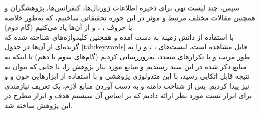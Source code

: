 سپس، چند لیست تهی برای ذخیره اطلاعات ژورنال‌ها، کنفرانس‌ها، پژوهشگران و همچنین مقالات مختلف مرتبط و موثر در این حوزه تحقیقاتی ساختیم، که به‌طور خلاصه با حروف
، ،  و 
از آن‌ها یاد می‌کنیم (گام دوم).\\
با استفاده از دانش زمینه به دست آمده و همچنین کلیدواژه‌های شناخته شده که گزیده‌ای از آن‌ها در جدول 
\ref{tab:keywords}
قابل مشاهده است، لیست‌های
، ،  و 
را به طور مرتب و با تکرارهای متعدد، به‌روزرسانی کردیم (گام‌های سوم تا دهم) تا اینکه به منابع ذکر شده در این سند
رسیدیم و منابع مورد نیاز پژوهش را، تا جایی که بتوان به نتیجه قابل اتکایی رسید، با این متدولوژی پژوهشی و با استفاده از ابزارهایی چون
\cite{noauthor_computing_nodate}
و 
\cite{noauthor_dblp:_nodate}
و نیز
\cite{noauthor_scimago_nodate}
پیدا کردیم. پس از شناخت دامنه و به دست آوردن منابع لازم، یک تعریف نیازمندی برای ابزار تست مورد نظر ارائه دادیم که بر اساس آن سیستم هدف و ابزار مطرح در این پژوهش ساخته شد.